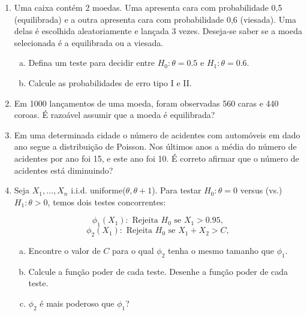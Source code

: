 \documentclass[10pt,brazil,addpoints]{exam}
\begin{document}
\begin{enumerate}[1.]

\item %
Uma caixa contém 2 moedas. Uma apresenta cara com probabilidade 0,5 (equilibrada) e a outra apresenta cara com probabilidade 0,6 (viesada). Uma delas é escolhida aleatoriamente e lançada 3 vezes. Deseja-se saber se a moeda selecionada é a equilibrada ou a viesada.

\begin{enumerate}[a)]
\item Defina um teste para decidir entre $H_0:\theta=0.5$ e $H_1:\theta=0.6$.
\item Calcule as probabilidades de erro tipo I e II.
\end{enumerate}






\medskip
\item %
 Em 1000 lançamentos de uma moeda, foram observadas 560 caras e 440 coroas. É razoável assumir
que a moeda é equilibrada?




\medskip
\item%
 Em uma determinada cidade o número de acidentes com automóveis em dado ano segue a distribuição de Poisson.
 Nos últimos anos a média do número de acidentes por ano foi 15, e este ano foi 10. É correto afirmar que o
número de acidentes está diminuindo?






\medskip
\item%
 Seja $X_1,\ldots,X_n$  i.i.d. uniforme($\theta,\theta+1$). Para testar $H_0:\theta =0$ versus (vs.) $H_1:\theta > 0$, temos dois testes concorrentes:

 $$\phi_1(X_1): \mbox{ Rejeita } H_0 \mbox{ se } X_1> 0.95,$$
 $$\phi_2(X_1): \mbox{ Rejeita } H_0 \mbox{ se } X_1+X_2> C,$$

\begin{enumerate}[a)]
\item Encontre o valor de $C$ para o qual $\phi_2$ tenha o mesmo tamanho  que $\phi_1$.

\item    Calcule a função poder de cada teste. Desenhe a função poder de cada teste.

\item $\phi_2$ é mais poderoso que $\phi_1$?


\end{enumerate}
\end{enumerate}
\end{document}
